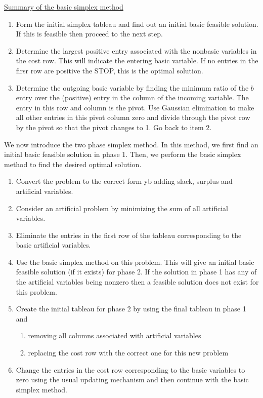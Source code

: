 \underline{Summary of the basic simplex method}
\begin{enumerate}
    \item Form the initial simplex tableau and find out an initial basic feasible solution. If this is feasible then proceed to the next step.
    \item Determine the largest positive entry associated with the nonbasic variables in the cost row. This will indicate the entering basic variable. If no entries in the firsr row are positive the STOP, this is the optimal solution.
    \item Determine the outgoing basic variable by finding the minimum ratio of the \(b\) entry over the (positive) entry in the column of the incoming variable. The entry in this row and column is the pivot. Use Gaussian elimination to make all other entries in this pivot column zero and divide through the pivot row by the pivot so that the pivot changes to 1. Go back to item 2.
\end{enumerate}

We now introduce the two phase simplex method. In this method, we first find an initial basic feasible solution in phase 1. Then, we perform the basic simplex method to find the desired optimal solution.
\begin{enumerate}
    \item Convert the problem to the correct form yb adding slack, surplus and artificial variables.
    \item Consider an artificial problem by minimizing the sum of all artificial variables.
    \item Eliminate the entries in the first row of the tableau corresponding to the basic artificial variables.
    \item Use the basic simplex method on this problem. This will give an initial basic feasible solution (if it exists) for phase 2. If the solution in phase 1 has any of the artificial variables being nonzero then a feasible solution does not exist for this problem.
    \item Create the initial tableau for phase 2 by using the final tableau in phase 1 and
          \begin{enumerate}
              \item removing all columns associated with artificial variables
              \item replacing the cost row with the correct one for this new problem
          \end{enumerate}
    \item Change the entries in the cost row corresponding to the basic variables to zero using the usual updating mechanism and then continue with the basic simplex method.
\end{enumerate}

